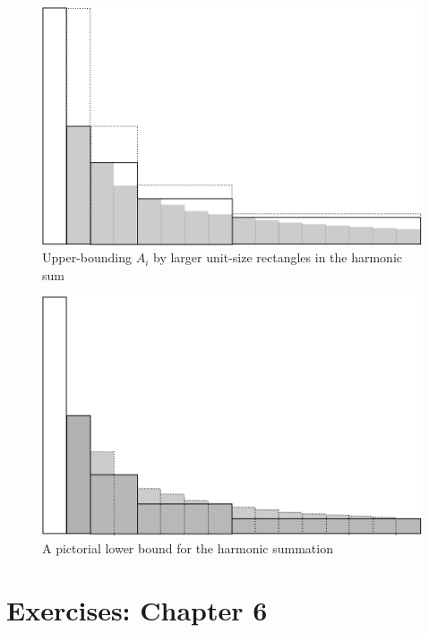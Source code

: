\begin{figure}[htb]
\centerline{
\includegraphics[scale=0.24]{FiguresMaths/HarmonicSumUpperbound}
}
\caption{Upper-bounding $A_i$ by larger unit-size rectangles in the harmonic sum}
\label{fig:HarmonicSumUpperbound}
\end{figure}

\begin{figure}[htb]
\centerline{
\includegraphics[scale=0.24]{FiguresMaths/HarmonicSumLowerbound}
}
\caption{A pictorial lower bound for the harmonic summation}
\label{fig:HarmonicSumLowerbound}
\end{figure}




\section{Exercises: Chapter 6}
\label{sec:ExerCh6}

